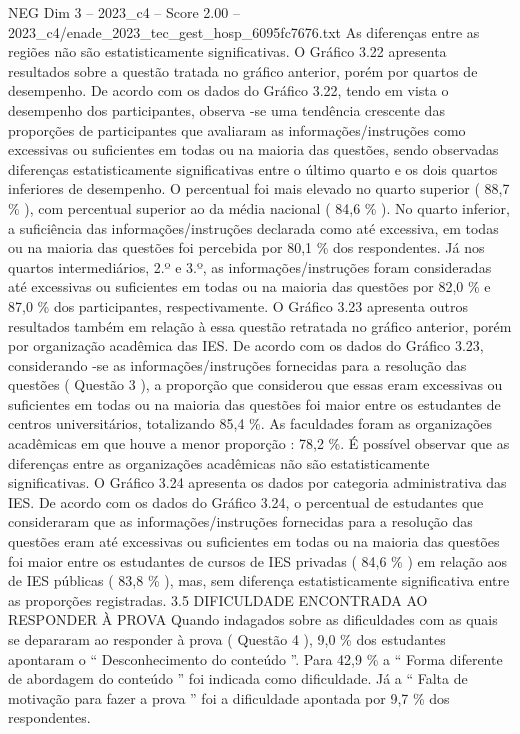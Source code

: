 \begin{textsample}{NEG Dim 3 – 2023\_c4 – Score 2.00 – 2023\_c4/enade\_2023\_tec\_gest\_hosp\_6095fc7676.txt}
As diferenças entre as regiões não são estatisticamente significativas.
O Gráfico 3.22 apresenta resultados sobre a questão tratada no gráfico anterior, porém por quartos de desempenho.
De acordo com os dados do Gráfico 3.22, tendo em vista o desempenho dos participantes, observa -se uma tendência crescente das proporções de participantes que avaliaram as informações/instruções como excessivas ou suficientes em todas ou na maioria das questões, sendo observadas diferenças estatisticamente significativas entre o último quarto e os dois quartos inferiores de desempenho.
O percentual foi mais elevado no quarto superior ( 88,7 \% ), com percentual superior ao da média nacional ( 84,6 \% ).
No quarto inferior, a suficiência das informações/instruções declarada como até excessiva, em todas ou na maioria das questões foi percebida por 80,1 \% dos respondentes.
Já nos quartos intermediários, 2.º e 3.º, as informações/instruções foram consideradas até excessivas ou suficientes em todas ou na maioria das questões por 82,0 \% e 87,0 \% dos participantes, respectivamente.
O Gráfico 3.23 apresenta outros resultados também em relação à essa questão retratada no gráfico anterior, porém por organização acadêmica das IES.
De acordo com os dados do Gráfico 3.23, considerando -se as informações/instruções fornecidas para a resolução das questões ( Questão 3 ), a proporção que considerou que essas eram excessivas ou suficientes em todas ou na maioria das questões foi maior entre os estudantes de centros universitários, totalizando 85,4 \%.
As faculdades foram as organizações acadêmicas em que houve a menor proporção : 78,2 \%.
É possível observar que as diferenças entre as organizações acadêmicas não são estatisticamente significativas.
O Gráfico 3.24 apresenta os dados por categoria administrativa das IES.
De acordo com os dados do Gráfico 3.24, o percentual de estudantes que consideraram que as informações/instruções fornecidas para a resolução das questões eram até excessivas ou suficientes em todas ou na maioria das questões foi maior entre os estudantes de cursos de IES privadas ( 84,6 \% ) em relação aos de IES públicas ( 83,8 \% ), mas, sem diferença estatisticamente significativa entre as proporções registradas. 3.5 DIFICULDADE ENCONTRADA AO RESPONDER À PROVA Quando indagados sobre as dificuldades com as quais se depararam ao responder à prova ( Questão 4 ), 9,0 \% dos estudantes apontaram o “ Desconhecimento do conteúdo ”.
Para 42,9 \% a “ Forma diferente de abordagem do conteúdo ” foi indicada como dificuldade.
Já a “ Falta de motivação para fazer a prova ” foi a dificuldade apontada por 9,7 \% dos respondentes.

\end{textsample}
